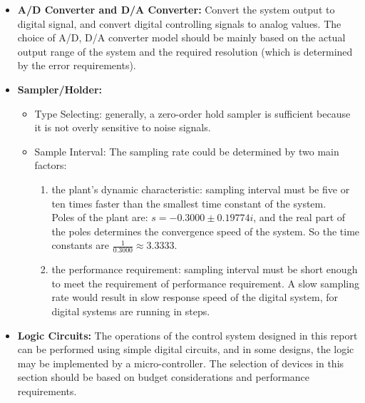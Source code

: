 \documentclass[12pt, oneside]{article}
\begin{document}
\begin{itemize}
    \item \textbf{A/D Converter and D/A Converter:} Convert the system output to digital signal, and convert digital controlling signals to analog values. The choice of A/D, D/A converter model should be mainly based on the actual output range of the system and the required resolution (which is determined by the error requirements).
    \item \textbf{Sampler/Holder:} 
    \begin{itemize}
        \item Type Selecting: generally, a zero-order hold sampler is sufficient because it is not overly sensitive to noise signals.
        \item Sample Interval: 
            The sampling rate could be determined by two main factors:
                \begin{enumerate}
                    \item the plant's dynamic characteristic: sampling interval must be five or ten times faster than the smallest time constant of the system. \\Poles of the plant are: $s=-0.3000\pm0.19774i$, and the real part of the poles determines the convergence speed of the system. So the time constants are $\frac{1}{0.3000}\approx3.3333$.
                    \item the performance requirement: sampling interval must be short enough to meet the requirement of performance requirement. A slow sampling rate would result in slow response speed of the digital system, for digital systems are running in steps.
                \end{enumerate}
    \end{itemize}
    
    \item \textbf{Logic Circuits:} The operations of the control system designed in this report can be performed using simple digital circuits, and in some designs, the logic may be implemented by a micro-controller. The selection of devices in this section should be based on budget considerations and performance requirements.


\end{itemize}
\end{document}
